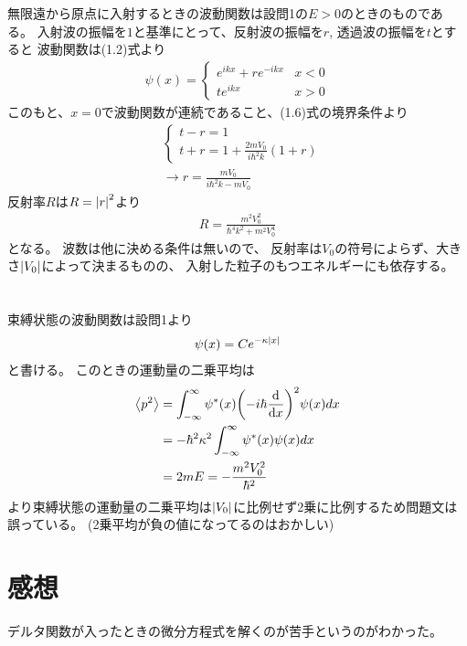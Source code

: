 \documentclass[../../master.tex]{subfiles}
\begin{document}
\section{}
無限遠から原点に入射するときの波動関数は設問1の\(E>0\)のときのものである。
入射波の振幅を\(1\)と基準にとって、反射波の振幅を\(r\), 透過波の振幅を\(t\)とすると
波動関数は(1.2)式より
\begin{align}
    \psi(x) = \begin{cases}
        e^{ikx} + r e^{-ikx} & x<0\\
        t e^{ikx} & x>0
    \end{cases}
\end{align}
このもと、\(x=0\)で波動関数が連続であること、(1.6)式の境界条件より
\begin{align}
    &\begin{cases}
        t-r = 1\\
        t+r = 1 +\frac{2mV_0}{i\hbar^2 k}(1+r)
    \end{cases}\\
    &\rightarrow r = \frac{mV_0}{i\hbar^2 k-mV_0}
\end{align}
反射率\(R\)は\(R=\abs{r}^2\)より
\begin{align}
    R = \frac{m^2 V_0^2}{\hbar^4k^2 + m^2 V_0^4}
\end{align}
となる。
波数は他に決める条件は無いので、
反射率は\(V_0\)の符号によらず、大きさ\(\abs{V_0}\)によって決まるものの、
入射した粒子のもつエネルギーにも依存する。

\section{}
束縛状態の波動関数は設問1より
\begin{align}
    \psi(x) = Ce^{-\kappa\abs{x}}
\end{align}
と書ける。
このときの運動量の二乗平均は
\begin{align}
    \ev{p^2}
        &= \int_{-\infty}^{\infty} \psi^*(x)\qty(-i\hbar\dv{x})^2\psi(x)dx\\
        &= -\hbar^2\kappa^2\int_{-\infty}^{\infty} \psi^*(x)\psi(x)dx\\
        &= 2mE = -\frac{m^2V_0^2}{\hbar^2}
\end{align}
より束縛状態の運動量の二乗平均は\(\abs{V_0}\)に比例せず2乗に比例するため問題文は誤っている。
(2乗平均が負の値になってるのはおかしい)

\section*{感想}
デルタ関数が入ったときの微分方程式を解くのが苦手というのがわかった。
\end{document}
